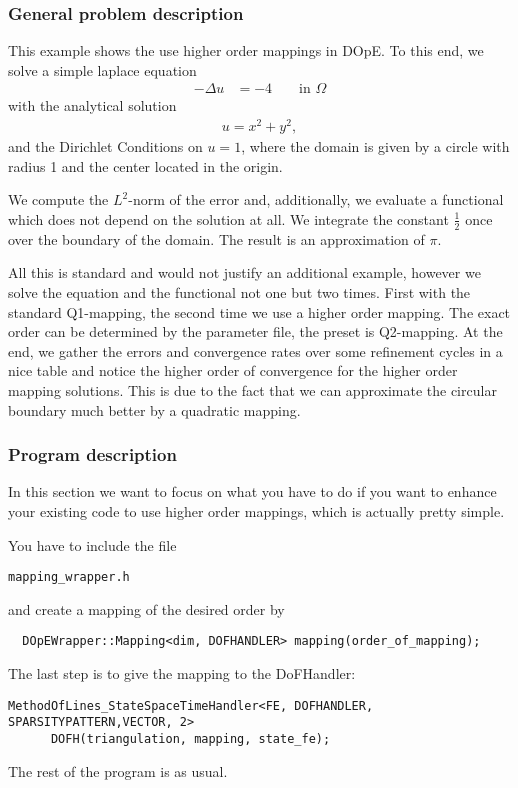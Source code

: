\subsubsection{General problem description}
This example shows the use higher order mappings in DOpE. To this end, we solve a simple laplace equation
\begin{align*}
-\Delta u &= -4 && \text{ in } \Omega
\end{align*}
with the analytical solution
\begin{align*}
u = {x^2 + y^2},
\end{align*}
and the Dirichlet Conditions on $u=1$, where the domain is given by a circle with radius 1 and the center located in the origin.

We compute the $L^2$-norm of the error and, additionally, we evaluate a functional which does not depend on the solution at all.
We integrate the constant $\frac 12$ once over the boundary of the domain. The result is an approximation of $\pi$.

All this is standard and would not justify an additional example, however we solve the equation and the functional not one but two
times. First with the standard Q1-mapping, the second time we use a higher order mapping. The exact order can be determined by the 
parameter file, the preset is Q2-mapping. At the end, we gather the errors and convergence rates over some refinement cycles
in a nice table and notice the higher order of convergence for the higher order mapping solutions. This is due to the fact that
we can approximate the circular boundary much better by a quadratic mapping.
\subsubsection{Program description}
In this section we want to focus on what you have to do if you want to enhance your existing code to use higher order mappings,
which is actually pretty simple.

You have to include the file
\begin{verbatim}
mapping_wrapper.h
\end{verbatim}

and create a mapping of the desired order by
\begin{verbatim}
  DOpEWrapper::Mapping<dim, DOFHANDLER> mapping(order_of_mapping);
\end{verbatim}

The last step is to give the mapping to the DoFHandler:
\begin{verbatim}
MethodOfLines_StateSpaceTimeHandler<FE, DOFHANDLER, SPARSITYPATTERN,VECTOR, 2> 
	  DOFH(triangulation, mapping, state_fe);
\end{verbatim}
The rest of the program is as usual.
